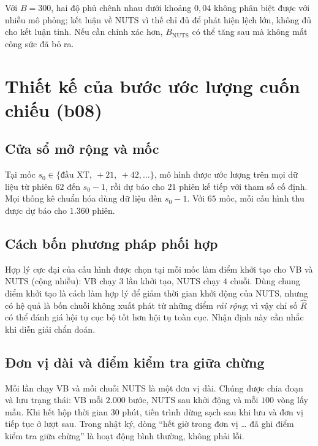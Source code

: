 \documentclass[12pt,a4paper]{article}
\theoremstyle{remark}
\newcommand{\XT}{\mathrm{XT}}
\begin{document}
Với $B=300$, hai độ phủ chênh nhau dưới khoảng $0{,}04$ không phân biệt được với nhiễu mô phỏng; kết luận về NUTS vì thế chỉ đủ để phát hiện lệch lớn, không đủ cho kết luận tinh. Nếu cần chính xác hơn, $B_{\mathrm{NUTS}}$ có thể tăng sau mà không mất công sức đã bỏ ra.

\section{Thiết kế của bước ước lượng cuốn chiếu (b08)}

\subsection{Cửa sổ mở rộng và mốc}

Tại mốc $s_0\in\{\text{đầu }\XT,\ +21,\ +42,\dots\}$, mô hình được ước lượng trên mọi dữ liệu từ phiên $62$ đến $s_0-1$, rồi dự báo cho $21$ phiên kế tiếp với tham số cố định. Mọi thống kê chuẩn hóa dùng dữ liệu đến $s_0-1$. Với $65$ mốc, mỗi cấu hình thu được dự báo cho $1.360$ phiên.

\subsection{Cách bốn phương pháp phối hợp}

Hợp lý cực đại của cấu hình được chọn tại mỗi mốc làm điểm khởi tạo cho VB và NUTS (cộng nhiễu): VB chạy $3$ lần khởi tạo, NUTS chạy $4$ chuỗi. Dùng chung điểm khởi tạo là cách làm hợp lý để giảm thời gian khởi động của NUTS, nhưng có hệ quả là bốn chuỗi không xuất phát từ những điểm \emph{rải rộng}; vì vậy chỉ số $\hat R$ có thể đánh giá hội tụ cục bộ tốt hơn hội tụ toàn cục. Nhận định này cần nhắc khi diễn giải chẩn đoán.

\subsection{Đơn vị dài và điểm kiểm tra giữa chừng}

Mỗi lần chạy VB và mỗi chuỗi NUTS là một đơn vị dài. Chúng được chia đoạn và lưu trạng thái: VB mỗi $2.000$ bước, NUTS sau khởi động và mỗi $100$ vòng lấy mẫu. Khi hết hộp thời gian $30$ phút, tiến trình dừng sạch sau khi lưu và đơn vị tiếp tục ở lượt sau. Trong nhật ký, dòng ``hết giờ trong đơn vị \dots{} đã ghi điểm kiểm tra giữa chừng'' là hoạt động bình thường, không phải lỗi.

\end{document}
